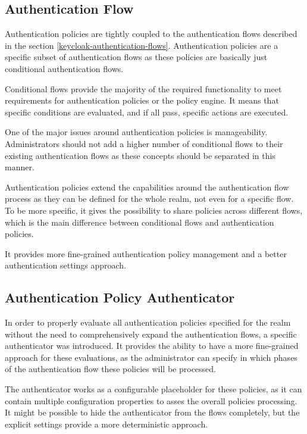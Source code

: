 \subsection{Authentication Flow}

Authentication policies are tightly coupled to the authentication flows described in the section \ref{keycloak-authentication-flows}.
Authentication policies are a specific subset of authentication flows as these policies are basically just conditional authentication flows.

Conditional flows provide the majority of the required functionality to meet requirements for authentication policies or the policy engine.
It means that specific conditions are evaluated, and if all pass, specific actions are executed.

One of the major issues around authentication policies is manageability.
Administrators should not add a higher number of conditional flows to their existing authentication flows as these concepts should be separated in this manner.

Authentication policies extend the capabilities around the authentication flow process as they can be defined for the whole realm, not even for a specific flow.
To be more specific, it gives the possibility to share policies across different flows, which is the main difference between conditional flows and authentication policies.

It provides more fine-grained authentication policy management and a better authentication settings approach.

\subsection{Authentication Policy Authenticator}
In order to properly evaluate all authentication policies specified for the realm without the need to comprehensively expand the authentication flows, a specific authenticator was introduced.
It provides the ability to have a more fine-grained approach for these evaluations, as the administrator can specify in which phases of the authentication flow these policies will be processed.

The authenticator works as a configurable placeholder for these policies, as it can contain multiple configuration properties to asses the overall policies processing.
It might be possible to hide the authenticator from the flows completely, but the explicit settings provide a more deterministic approach.

